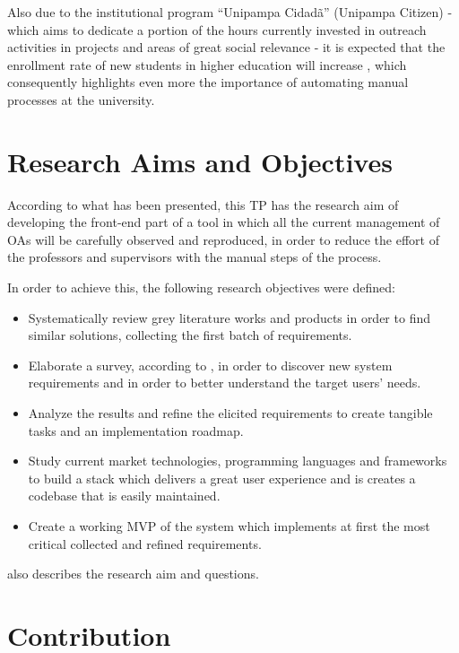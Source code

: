 Also due to the institutional program ``Unipampa Cidadã'' (Unipampa Citizen) - which aims to dedicate a portion of the hours currently invested in outreach activities in projects and areas of great social relevance - it is expected that the enrollment rate of new students in higher education will increase \cite{unipampacidada}, which consequently highlights even more the importance of automating manual processes at the university.

\section{Research Aims and Objectives}\label{sec:objectives}

According to what has been presented, this \ac{TP} has the research aim of developing the front-end part of a tool in which all the current management of \acp{OA} will be carefully observed and reproduced, in order to reduce the effort of the professors and supervisors with the manual steps of the process.

In order to achieve this, the following research objectives were defined:

\begin{itemize}
  \item Systematically review grey literature works and products in order to find similar solutions, collecting the first batch of requirements.
  \item Elaborate a survey, according to , in order to discover new system requirements and in order to better understand the target users' needs.
  \item Analyze the results and refine the elicited requirements to create tangible tasks and an implementation roadmap.
  \item Study current market technologies, programming languages and frameworks to build a stack which delivers a great user experience and is creates a codebase that is easily maintained.
  \item Create a working \ac{MVP} of the system which implements at first the most critical collected and refined requirements.
\end{itemize}

 also describes the research aim and questions.



\section{Contribution}\label{sec:contribution}

